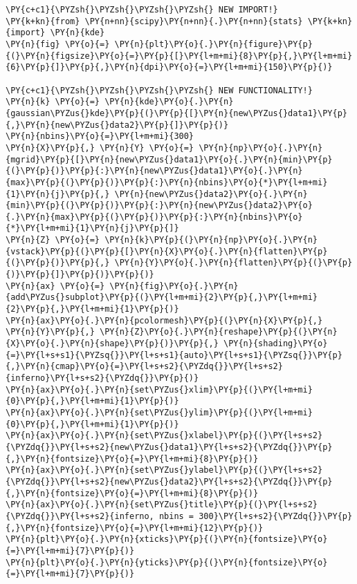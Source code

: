     \begin{tcolorbox}[breakable, size=fbox, boxrule=1pt, pad at break*=1mm,colback=cellbackground, colframe=cellborder]
\begin{Verbatim}[commandchars=\\\{\}]
\PY{c+c1}{\PYZsh{}\PYZsh{}\PYZsh{}\PYZsh{} NEW IMPORT!}
\PY{k+kn}{from} \PY{n+nn}{scipy}\PY{n+nn}{.}\PY{n+nn}{stats} \PY{k+kn}{import} \PY{n}{kde}
\PY{n}{fig} \PY{o}{=} \PY{n}{plt}\PY{o}{.}\PY{n}{figure}\PY{p}{(}\PY{n}{figsize}\PY{o}{=}\PY{p}{[}\PY{l+m+mi}{8}\PY{p}{,}\PY{l+m+mi}{6}\PY{p}{]}\PY{p}{,}\PY{n}{dpi}\PY{o}{=}\PY{l+m+mi}{150}\PY{p}{)} 

\PY{c+c1}{\PYZsh{}\PYZsh{}\PYZsh{}\PYZsh{} NEW FUNCTIONALITY!}
\PY{n}{k} \PY{o}{=} \PY{n}{kde}\PY{o}{.}\PY{n}{gaussian\PYZus{}kde}\PY{p}{(}\PY{p}{[}\PY{n}{new\PYZus{}data1}\PY{p}{,}\PY{n}{new\PYZus{}data2}\PY{p}{]}\PY{p}{)}
\PY{n}{nbins}\PY{o}{=}\PY{l+m+mi}{300}
\PY{n}{X}\PY{p}{,} \PY{n}{Y} \PY{o}{=} \PY{n}{np}\PY{o}{.}\PY{n}{mgrid}\PY{p}{[}\PY{n}{new\PYZus{}data1}\PY{o}{.}\PY{n}{min}\PY{p}{(}\PY{p}{)}\PY{p}{:}\PY{n}{new\PYZus{}data1}\PY{o}{.}\PY{n}{max}\PY{p}{(}\PY{p}{)}\PY{p}{:}\PY{n}{nbins}\PY{o}{*}\PY{l+m+mi}{1}\PY{n}{j}\PY{p}{,} \PY{n}{new\PYZus{}data2}\PY{o}{.}\PY{n}{min}\PY{p}{(}\PY{p}{)}\PY{p}{:}\PY{n}{new\PYZus{}data2}\PY{o}{.}\PY{n}{max}\PY{p}{(}\PY{p}{)}\PY{p}{:}\PY{n}{nbins}\PY{o}{*}\PY{l+m+mi}{1}\PY{n}{j}\PY{p}{]}
\PY{n}{Z} \PY{o}{=} \PY{n}{k}\PY{p}{(}\PY{n}{np}\PY{o}{.}\PY{n}{vstack}\PY{p}{(}\PY{p}{[}\PY{n}{X}\PY{o}{.}\PY{n}{flatten}\PY{p}{(}\PY{p}{)}\PY{p}{,} \PY{n}{Y}\PY{o}{.}\PY{n}{flatten}\PY{p}{(}\PY{p}{)}\PY{p}{]}\PY{p}{)}\PY{p}{)}
\PY{n}{ax} \PY{o}{=} \PY{n}{fig}\PY{o}{.}\PY{n}{add\PYZus{}subplot}\PY{p}{(}\PY{l+m+mi}{2}\PY{p}{,}\PY{l+m+mi}{2}\PY{p}{,}\PY{l+m+mi}{1}\PY{p}{)}
\PY{n}{ax}\PY{o}{.}\PY{n}{pcolormesh}\PY{p}{(}\PY{n}{X}\PY{p}{,} \PY{n}{Y}\PY{p}{,} \PY{n}{Z}\PY{o}{.}\PY{n}{reshape}\PY{p}{(}\PY{n}{X}\PY{o}{.}\PY{n}{shape}\PY{p}{)}\PY{p}{,} \PY{n}{shading}\PY{o}{=}\PY{l+s+s1}{\PYZsq{}}\PY{l+s+s1}{auto}\PY{l+s+s1}{\PYZsq{}}\PY{p}{,}\PY{n}{cmap}\PY{o}{=}\PY{l+s+s2}{\PYZdq{}}\PY{l+s+s2}{inferno}\PY{l+s+s2}{\PYZdq{}}\PY{p}{)}
\PY{n}{ax}\PY{o}{.}\PY{n}{set\PYZus{}xlim}\PY{p}{(}\PY{l+m+mi}{0}\PY{p}{,}\PY{l+m+mi}{1}\PY{p}{)}
\PY{n}{ax}\PY{o}{.}\PY{n}{set\PYZus{}ylim}\PY{p}{(}\PY{l+m+mi}{0}\PY{p}{,}\PY{l+m+mi}{1}\PY{p}{)}
\PY{n}{ax}\PY{o}{.}\PY{n}{set\PYZus{}xlabel}\PY{p}{(}\PY{l+s+s2}{\PYZdq{}}\PY{l+s+s2}{new\PYZus{}data1}\PY{l+s+s2}{\PYZdq{}}\PY{p}{,}\PY{n}{fontsize}\PY{o}{=}\PY{l+m+mi}{8}\PY{p}{)}
\PY{n}{ax}\PY{o}{.}\PY{n}{set\PYZus{}ylabel}\PY{p}{(}\PY{l+s+s2}{\PYZdq{}}\PY{l+s+s2}{new\PYZus{}data2}\PY{l+s+s2}{\PYZdq{}}\PY{p}{,}\PY{n}{fontsize}\PY{o}{=}\PY{l+m+mi}{8}\PY{p}{)}
\PY{n}{ax}\PY{o}{.}\PY{n}{set\PYZus{}title}\PY{p}{(}\PY{l+s+s2}{\PYZdq{}}\PY{l+s+s2}{inferno, nbins = 300}\PY{l+s+s2}{\PYZdq{}}\PY{p}{,}\PY{n}{fontsize}\PY{o}{=}\PY{l+m+mi}{12}\PY{p}{)}
\PY{n}{plt}\PY{o}{.}\PY{n}{xticks}\PY{p}{(}\PY{n}{fontsize}\PY{o}{=}\PY{l+m+mi}{7}\PY{p}{)}
\PY{n}{plt}\PY{o}{.}\PY{n}{yticks}\PY{p}{(}\PY{n}{fontsize}\PY{o}{=}\PY{l+m+mi}{7}\PY{p}{)}



\end{Verbatim}
\end{tcolorbox}
